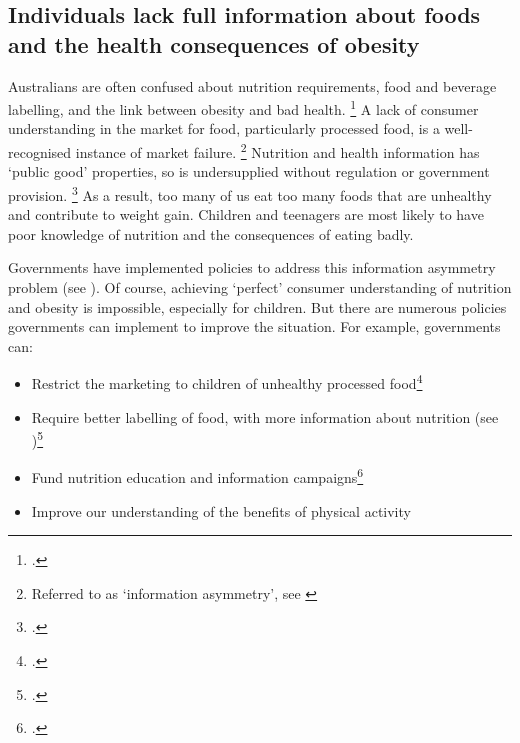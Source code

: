 \documentclass[embargoed]{grattan}
\begin{document}
\subsection{Individuals lack full information about foods and the health consequences of obesity }\label{individuals-lack-full-information-about-foods-and-the-health-consequences-of-obesity}

Australians are often confused about nutrition requirements, food and beverage labelling, and the link between obesity and bad health.%
\footcites{Baker2014Fatnationwhy}{Karnani2016ObesityCrisisas} A lack of consumer understanding in the market for food, particularly processed food, is a well-recognised instance of market failure.%
\footnote{Referred to as `information asymmetry', see \textcites{Karnani2016ObesityCrisisas}{Freebairn2010Taxationobesity}} Nutrition and health information has `public good' properties, so is undersupplied without regulation or government provision.%
\footcite{Freebairn2010Taxationobesity} As a result, too many of us eat too many foods that are unhealthy and contribute to weight gain.
Children and teenagers are most likely to have poor knowledge of nutrition and the consequences of eating badly.

Governments have implemented policies to address this information asymmetry problem (see ).
Of course, achieving `perfect' consumer understanding of nutrition and obesity is impossible, especially for children.
But there are numerous policies governments can implement to improve the situation.
For example, governments can:

\begin{itemize}[topsep=-0.5ex, itemsep=-0.5ex]
\item
  Restrict the marketing to children of unhealthy processed food\footcites{Organization2016Reportcommissionending}{Cairns2013Systematicreviewsevidence}{Magnus2009costeffectivenessremoving}{Chou2005Fastfoodrestaurant}{Boyland2011Foodcommercialsincrease}{Capacci2012Policiespromotehealthy}
\item
  Require better labelling of food, with more information about nutrition (see )\footcites{MacKay2011Legislativesolutionsunhealthy}{Freebairn2010Taxationobesity}{Capacci2012Policiespromotehealthy}{Roberto2012Factsfrontversus}{Restrepo2014Calorielabelingchain}{Magnusson2010Obesitypreventionpersonal}{Cowburn2005Consumerunderstandinguse}{Hawley2013sciencefrontpackage}{Mejean2014Associationperceptionfront}
\item
  Fund nutrition education and information campaigns\footcites{Organization2016Reportcommissionending}{Capacci2012Policiespromotehealthy}{Hawkes2013Promotinghealthydiets}{Pettigrew2013Consumersinabilityestimate}{Liquori1998CookshopProgramoutcome}
\item
  Improve our understanding of the benefits of physical activity
 \end{itemize}
\end{document}
